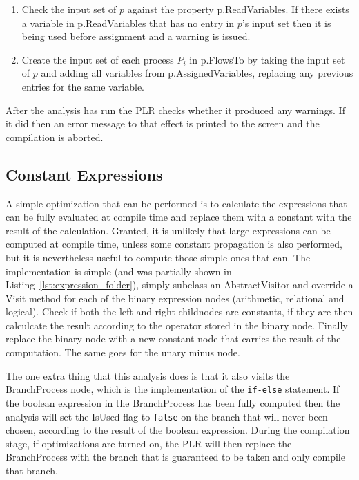   	\begin{enumerate}
  		\item Check the input set of $p$ against the property \textsf{p.ReadVariables}.
  		If there exists a variable in \textsf{p.ReadVariables} that has no entry
  		in $p$'s input set then it is being used before assignment and a warning is issued.
  		
  		\item Create the input set of each process $P_i$ in \textsf{p.FlowsTo} by taking
  		the input set of $p$ and adding all variables from \textsf{p.AssignedVariables}, 
  		replacing any previous entries for the same variable.
  	\end{enumerate}
  	
  After the analysis has run the PLR checks whether it produced any warnings. If it
  did then an error message to that effect is printed to the screen and the 
  compilation is aborted.
	

\subsection{Constant Expressions}

	A simple optimization that can be performed is to calculate the expressions that
	can be fully evaluated at compile time and replace them with a constant with
	the result of the calculation. Granted, it is unlikely that large expressions
	can be computed at compile time, unless some constant propagation is also 
	performed, but it is nevertheless useful to compute those simple ones that can.
	The implementation is simple (and was partially shown in Listing~\ref{lst:expression_folder}), 
	simply subclass an \textsf{AbstractVisitor} and override a \textsf{Visit} method
	for each of the binary expression nodes (arithmetic, relational and logical). 
	Check if both the left and right childnodes are constants, if they are then
	calculcate the result according to the operator stored in the binary node. 
	Finally replace the binary node with a new constant node that carries the result
	of the computation. The same goes for the unary minus node.
	
	The one extra thing that this analysis does is that it also visits the
	\textsf{BranchProcess} node, which is the implementation of the \texttt{if-else}
	statement. If the boolean expression in the \textsf{BranchProcess} has been
	fully computed then the analysis will set the \textsf{IsUsed} flag to \texttt{false}
	on the branch that will never been chosen, according to the result of the boolean
	expression. During the compilation stage, if optimizations are turned on, the
	PLR will then replace the \textsf{BranchProcess} with the branch that is 
	guaranteed to be taken and only compile that branch.

